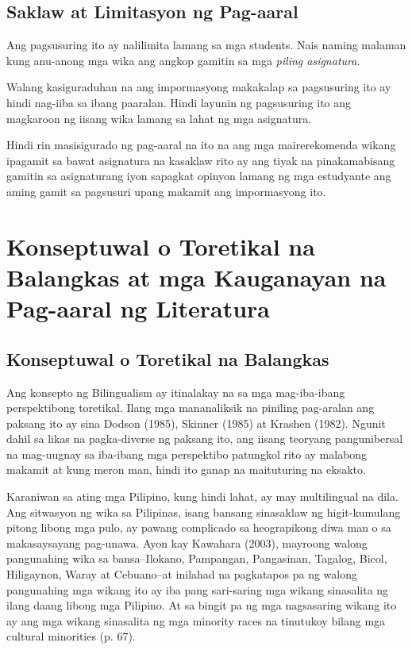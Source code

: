 \documentclass [11pt] {report}
\begin{document}
\pagebreak
\section {Saklaw at Limitasyon ng Pag-aaral}
Ang pagsusuring ito ay nalilimita lamang sa mga \glspl{student}. Nais
naming malaman kung anu-anong mga wika ang angkop gamitin sa mga \emph{piling
  asignatura}.

Walang kasiguraduhan na ang impormasyong makakalap sa pagsusuring ito ay hindi
nag-iiba sa ibang paaralan. Hindi layunin ng pagsusuring ito ang magkaroon ng
iisang wika lamang sa lahat ng mga asignatura.

Hindi rin masisigurado ng pag-aaral na ito na ang mga mairerekomenda wikang
ipagamit sa bawat asignatura na kasaklaw rito ay ang tiyak na pinakamabisang
gamitin sa asignaturang iyon sapagkat opinyon lamang ng mga estudyante ang aming
gamit sa pagsusuri upang makamit ang impormasyong ito.

\printglossary

\chapter{Konseptuwal o Toretikal na Balangkas at mga Kauganayan na Pag-aaral ng Literatura}
\section {Konseptuwal o Toretikal na Balangkas}
Ang konsepto ng Bilingualism ay itinalakay na sa mga mag-iba-ibang perspektibong
toretikal. Ilang mga mananaliksik na piniling pag-aralan ang paksang ito ay sina
Dodson (1985), Skinner (1985) at Krashen (1982). Ngunit dahil sa likas na
pagka-diverse ng paksang ito, ang iisang teoryang pangunibersal na mag-uugnay sa
iba-ibang mga perspektibo patungkol rito ay malabong makamit at kung meron man,
hindi ito ganap na maituturing na eksakto.

Karaniwan sa ating mga Pilipino, kung hindi lahat, ay may multilingual na dila.
Ang sitwasyon ng wika sa Pilipinas, isang bansang sinasaklaw ng higit-kumulang
pitong libong mga pulo, ay pawang complicado sa heograpikong diwa man o sa
makasaysayang pag-unawa. Ayon kay Kawahara (2003), mayroong walong pangunahing
wika sa bansa--Ilokano, Pampangan, Pangasinan, Tagalog, Bicol, Hiligaynon, Waray
at Cebuano--at inilahad na pagkatapos pa ng walong pangunahing mga wikang ito ay
iba pang sari-saring mga wikang sinasalita ng ilang daang libong mga Pilipino.
At sa bingit pa ng mga nagsasaring wikang ito ay ang mga wikang sinasalita ng
mga minority races na tinutukoy bilang mga cultural minorities (p. 67).
\end{document}
